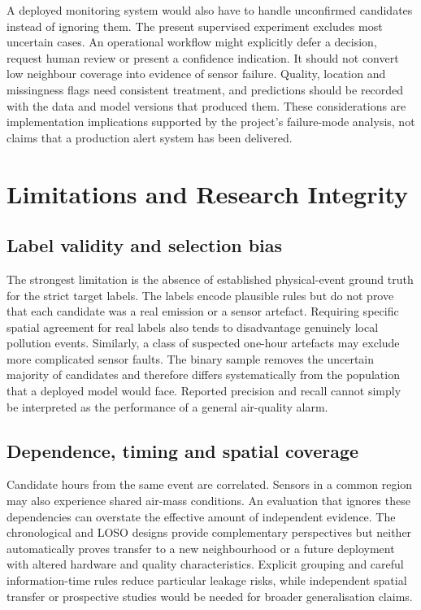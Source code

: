 \documentclass[12pt,a4paper,oneside]{report}
\begin{document}
A deployed monitoring system would also have to handle unconfirmed candidates instead of ignoring them. The present supervised experiment excludes most uncertain cases. An operational workflow might explicitly defer a decision, request human review or present a confidence indication. It should not convert low neighbour coverage into evidence of sensor failure. Quality, location and missingness flags need consistent treatment, and predictions should be recorded with the data and model versions that produced them. These considerations are implementation implications supported by the project's failure-mode analysis, not claims that a production alert system has been delivered.

\chapter{Limitations and Research Integrity}
\section{Label validity and selection bias}
The strongest limitation is the absence of established physical-event ground truth for the strict target labels. The labels encode plausible rules but do not prove that each candidate was a real emission or a sensor artefact. Requiring specific spatial agreement for real labels also tends to disadvantage genuinely local pollution events. Similarly, a class of suspected one-hour artefacts may exclude more complicated sensor faults. The binary sample removes the uncertain majority of candidates and therefore differs systematically from the population that a deployed model would face. Reported precision and recall cannot simply be interpreted as the performance of a general air-quality alarm.

\section{Dependence, timing and spatial coverage}
Candidate hours from the same event are correlated. Sensors in a common region may also experience shared air-mass conditions. An evaluation that ignores these dependencies can overstate the effective amount of independent evidence. The chronological and LOSO designs provide complementary perspectives but neither automatically proves transfer to a new neighbourhood or a future deployment with altered hardware and quality characteristics. Explicit grouping and careful information-time rules reduce particular leakage risks, while independent spatial transfer or prospective studies would be needed for broader generalisation claims.
\end{document}
